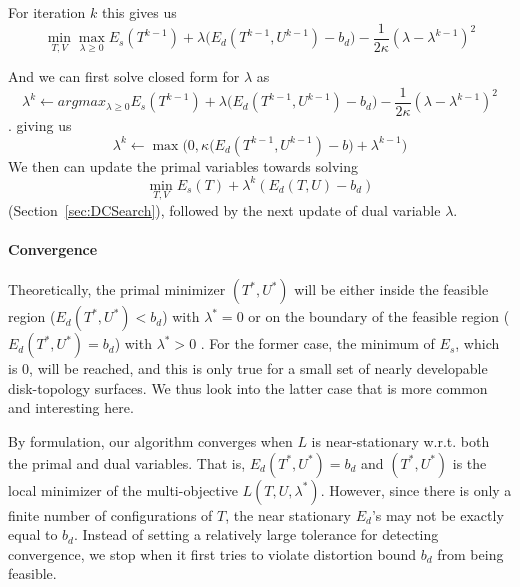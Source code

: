 For iteration $k$ this gives us 
\[ \min_{T,V} \max_{\lambda \geq 0} E_{s}(T^{k-1}) + \lambda \big( E_{d}(T^{k-1}, U^{k-1}) - b_d\big) - \frac{1}{2\kappa} (\lambda- \lambda^{k-1})^2 \]

And we can first solve closed form for $\lambda$ as 
\[ \lambda^{k} \leftarrow argmax_{\lambda \geq 0} E_{s}(T^{k-1}) + \lambda \big( E_{d}(T^{k-1}, U^{k-1}) - b_d\big) - \frac{1}{2\kappa} (\lambda- \lambda^{k-1})^2 \]
%
.
%
giving us 
\[ \lambda^{k} \leftarrow \max\big(0,\kappa \big( E_{d}(T^{k-1}, U^{k-1}) -b \big) + \lambda^{k-1}\big) \]
%
We then can update the primal variables towards solving
\[ \min_{T,V}  E_{s}(T) + \lambda^{k}  (E_{d}(T, U) - b_d) \]
(Section~\ref{sec:DCSearch}), followed by the next update of dual variable $\lambda$.




\paragraph{Convergence}
Theoretically, the primal minimizer $(T^*, U^*)$ will be either inside the feasible region ($E_d(T^*, U^*) < b_d$) with $\lambda^* = 0$ or on the boundary of the feasible region ($E_d(T^*, U^*) = b_d$) with $\lambda^* > 0$ \cite{a computational optimization book}. For the former case, the minimum of $E_s$, which is $0$, will be reached, and this is only true for a small set of nearly developable disk-topology surfaces. We thus look into the latter case that is more common and interesting here.

By formulation, our algorithm converges when $L$ is near-stationary w.r.t. both the primal and dual variables. That is, $E_d(T^*, U^*) = b_d$ and $(T^*, U^*)$ is the local minimizer of the multi-objective $L(T,U,\lambda^*)$. However, since there is only a finite number of configurations of $T$, the near stationary $E_d$'s may not be exactly equal to $b_d$. Instead of setting a relatively large tolerance for detecting convergence, we stop when it first tries to violate distortion bound $b_d$ from being feasible.
